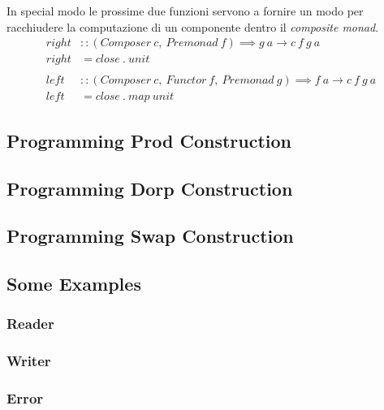 In special modo le prossime due funzioni servono a fornire un modo per racchiudere
la computazione di un componente dentro il \textit{composite monad}.
\label{left_and_right}
\begin{align*}
  right &:: (Composer\ c,\ Premonad\ f) \implies g\ a \to c\ f\ g\ a\\
  right &= close\ .\ unit\\\\
  left &:: (Composer\ c,\ Functor\ f,\ Premonad\ g) \implies f\ a \to c\ f\ g\ a\\
  left &= close\ .\ map\ unit
\end{align*}

\subsection{Programming Prod Construction}
\label{programming_prod_construction}

\subsection{Programming Dorp Construction}
\label{programming_dorp_construction}

\subsection{Programming Swap Construction}
\label{programming_swap_construction}

\subsection{Some Examples}
\label{some_examples}

\subsubsection*{Reader}

\subsubsection*{Writer}

\subsubsection*{Error}

\pagebreak